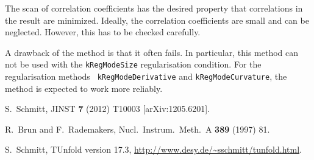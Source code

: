 \documentclass[12pt]{article}
\newcommand{\tunfoldmajor}{17}
\newcommand{\tunfoldminor}{3}
\newcommand{\tunfoldversion}{{\tunfoldmajor{}.\tunfoldminor}}
\begin{document}
The scan of correlation coefficients has the desired property that
correlations in the result are minimized. Ideally, the correlation
coefficients are small and can be neglected. However, this has to be
checked carefully.

A drawback of the method is that it often fails. In particular, this
method can not be used with the {\tt kRegModeSize}
regularisation condition. For the regularisation methods {\tt
  kRegModeDerivative} and {\tt kRegModeCurvature}, the method is
expected to work more reliably.


\begin{flushleft}
\begin{thebibliography}{99}

  S.~Schmitt,
  JINST {\bf 7} (2012) T10003
  [arXiv:1205.6201].

  R.~Brun and F.~Rademakers,
  Nucl.\ Instrum.\ Meth.\  A {\bf 389} (1997) 81.

S.~Schmitt, TUnfold version \tunfoldversion, 
\url{http://www.desy.de/~sschmitt/tunfold.html}.

\end{thebibliography}
\end{flushleft}
\end{document}
